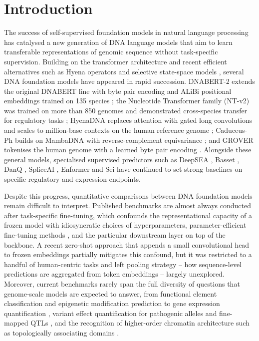 
\section{Introduction}

The success of self-supervised foundation models in natural language processing has catalysed a new generation of DNA language models that aim to learn transferable representations of genomic sequence without task-specific supervision. Building on the transformer architecture \citep{vaswani2017attention,devlin2019bert} and recent efficient alternatives such as Hyena operators \citep{poli2023hyena} and selective state-space models \citep{gu2023mamba}, several DNA foundation models have appeared in rapid succession. DNABERT-2 extends the original DNABERT line with byte pair encoding and ALiBi positional embeddings trained on 135 species \citep{zhou2024dnabert2}; the Nucleotide Transformer family (NT-v2) was trained on more than 850 genomes and demonstrated cross-species transfer for regulatory tasks \citep{dallatorre2025nt}; HyenaDNA replaces attention with gated long convolutions and scales to million-base contexts on the human reference genome \citep{nguyen2023hyenadna}; Caduceus-Ph builds on MambaDNA with reverse-complement equivariance \citep{schiff2024caduceus}; and GROVER tokenises the human genome with a learned byte pair encoding \citep{sanabria2024grover}. Alongside these general models, specialised supervised predictors such as DeepSEA \citep{zhou2015deepsea}, Basset \citep{kelley2016basset}, DanQ \citep{quang2016danq}, SpliceAI \citep{jaganathan2019spliceai}, Enformer \citep{avsec2021enformer} and Sei \citep{chen2022sei} have continued to set strong baselines on specific regulatory and expression endpoints.

Despite this progress, quantitative comparisons between DNA foundation models remain difficult to interpret. Published benchmarks are almost always conducted after task-specific fine-tuning, which confounds the representational capacity of a frozen model with idiosyncratic choices of hyperparameters, parameter-efficient fine-tuning methods \citep{yuan2026borzoi_peft}, and the particular downstream layer on top of the backbone. A recent zero-shot approach that appends a small convolutional head to frozen embeddings partially mitigates this confound, but it was restricted to a handful of human-centric tasks and left pooling strategy -- how sequence-level predictions are aggregated from token embeddings -- largely unexplored. Moreover, current benchmarks rarely span the full diversity of questions that genome-scale models are expected to answer, from functional element classification and epigenetic modification prediction to gene expression quantification \citep{avsec2021enformer,karollus2023enformer_limits}, variant effect quantification for pathogenic alleles \citep{landrum2018clinvar,jaganathan2019spliceai} and fine-mapped QTLs \citep{gtex2020}, and the recognition of higher-order chromatin architecture such as topologically associating domains \citep{dixon2012topological,lieberman2009hic}.

